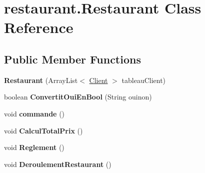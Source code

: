 \hypertarget{classrestaurant_1_1_restaurant}{}\section{restaurant.\+Restaurant Class Reference}
\label{classrestaurant_1_1_restaurant}
\subsection*{Public Member Functions}
\begin{DoxyCompactItemize}
\item 
{\bfseries Restaurant} (Array\+List$<$ \hyperlink{classclient_1_1_client}{Client} $>$ tableau\+Client)\hypertarget{classrestaurant_1_1_restaurant_aa77684458e43d92a94b30cf10bace9cd}{}\label{classrestaurant_1_1_restaurant_aa77684458e43d92a94b30cf10bace9cd}

\item 
boolean {\bfseries Convertit\+Oui\+En\+Bool} (String ouinon)\hypertarget{classrestaurant_1_1_restaurant_a66a62a3634041833baf1451bb01d8d58}{}\label{classrestaurant_1_1_restaurant_a66a62a3634041833baf1451bb01d8d58}

\item 
void {\bfseries commande} ()\hypertarget{classrestaurant_1_1_restaurant_a2903cccb976a094b95f0481551e67aef}{}\label{classrestaurant_1_1_restaurant_a2903cccb976a094b95f0481551e67aef}

\item 
void {\bfseries Calcul\+Total\+Prix} ()\hypertarget{classrestaurant_1_1_restaurant_a69c1ab00ecdd7db6f07b064dab415dfc}{}\label{classrestaurant_1_1_restaurant_a69c1ab00ecdd7db6f07b064dab415dfc}

\item 
void {\bfseries Reglement} ()\hypertarget{classrestaurant_1_1_restaurant_aeaf5686a6f8bf486b7f88276e93baacd}{}\label{classrestaurant_1_1_restaurant_aeaf5686a6f8bf486b7f88276e93baacd}

\item 
void {\bfseries Deroulement\+Restaurant} ()\hypertarget{classrestaurant_1_1_restaurant_a0d97ba5d34067c21d8afaa28fb704b48}{}\label{classrestaurant_1_1_restaurant_a0d97ba5d34067c21d8afaa28fb704b48}

\end{DoxyCompactItemize}
